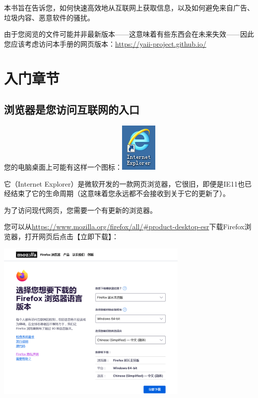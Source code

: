 本书旨在告诉您，如何快速高效地从互联网上获取信息，以及如何避免来自广告、垃圾内容、恶意软件的骚扰。

由于您阅览的文件可能并非最新版本------这意味着有些东西会在未来失效------因此您应该考虑访问本手册的网页版本：\url{https://yaii-project.github.io/}

\section{入门章节}\label{ux5165ux95e8ux7ae0ux8282}

\subsection{浏览器是您访问互联网的入口}\label{ux6d4fux89c8ux5668ux662fux60a8ux8bbfux95eeux4e92ux8054ux7f51ux7684ux5165ux53e3}

您的电脑桌面上可能有这样一个图标：\includegraphics[width=0.69792in,height=0.92708in]{media/image1.png}

它（Internet
Explorer）是微软开发的一款网页浏览器，它很旧，即便是IE11也已经结束了它的生命周期（这意味着您永远都不会接收到关于它的更新了）。

为了访问现代网页，您需要一个有更新的浏览器。

您可以从\url{https://www.mozilla.org/firefox/all/\#product-desktop-esr}下载Firefox浏览器，打开网页后点击【立即下载】：

\includegraphics[width=3.64168in,height=3.0625in]{media/image2.png}


